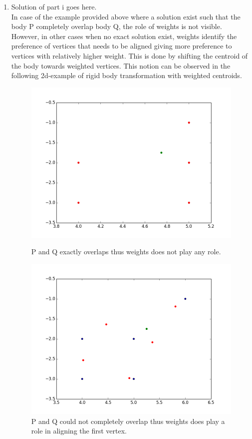 \documentclass[a4paper, 11pt]{article}
\begin{document}
\begin{enumerate}[label=\alph*.]
    \item
    Solution of part i goes here.\\
    In case of the example provided above where a solution exist such that the body P completely overlap body Q, the role of weights is not visible. However, in other cases when no exact solution exist, weights identify the preference of vertices that needs to be aligned giving more preference to vertices with relatively higher weight. This is done by shifting the centroid of the body towards weighted vertices. This notion can be observed in the following 2d-example of rigid body transformation with weighted centroids.\\
    \begin{figure}
    \centering
        \includegraphics[scale=0.5]{figure_3.png}
        \caption{P and Q exactly overlaps thus weights does not play any role.}\label{fig:figure_3.png}
        \includegraphics[scale=0.5]{figure_2.png}
        \caption{P and Q could not completely overlap thus weights does play a role in aligning the first vertex.}\label{fig:figure_2.png}
    \end{figure}
\end{enumerate}
\end{document}
